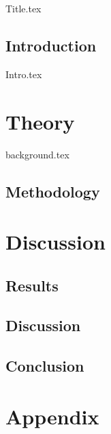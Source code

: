 \documentclass[a4paper,
               11pt,
               ]{Zeambles/MyProject}
\begin{document}
\def\spath#1{{#1.tex}}
\spath{Title} %

\tableofcontents







\newpage
{}
\chapter*{Introduction} 
\spath{Intro}

\part{Theory}

\spath{background}


\newpage
\chapter{Methodology}


\newpage
\part{Discussion}
\chapter{Results}


\newpage
\chapter{Discussion}

\newpage
\chapter{Conclusion}

\newpage
\printbibliography[title={Bliblyogrpah}]
\newpage

\part{Appendix}
\end{document}
